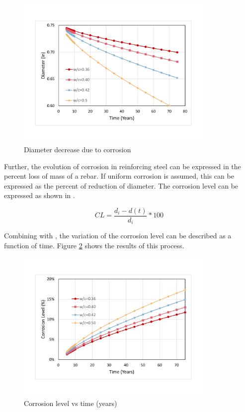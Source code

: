 \begin{figure}[htbp]
\centering
\includegraphics[width=0.85\textwidth]{Chapter-2/figs/DiameterDecrease}
\caption{Diameter decrease due to corrosion}
\label{fig:DiameterEvolution}
\end{figure}

Further, the evolution of corrosion in reinforcing steel can be expressed in the percent loss of mass of a rebar. If uniform corrosion is assumed, this can be expressed as the percent of reduction of diameter. The corrosion level can be expressed as shown in .

\begin{equation}
	CL=\frac{d_{i}-d(t)}{d_{i}}*100%
  \label{eq.CorrosionLevel}
\end{equation} 

Combining  with ,  the variation of the corrosion level can be described as a function of time. Figure  \ref{fig:CorrosionLevel_Time} shows the results of this process.

\begin{figure}[htbp]
\centering
\includegraphics[width=0.85\textwidth]{Chapter-2/figs/CorrosionLevel}
\caption{Corrosion level vs time (years)}
\label{fig:CorrosionLevel_Time}
\end{figure}

